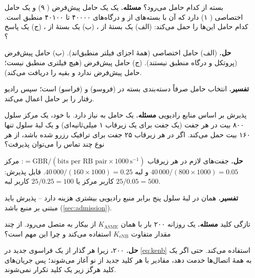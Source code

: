 \documentclass[11pt,a4paper]{article}
\begin{document}
\begin{examplebox}{بسته از کدام حامل می‌رود؟}\label{ex:tft}
\textbf{مسئله.} یک  یک حامل پیش‌فرض ( ۹) و یک حامل اختصاصی ( ۱) دارد که  آن با
بسته‌های  از  و درگاه‌های ۴۰۰۰۰ تا ۴۰۱۰۰ منطبق است. کدام حامل این‌ها را حمل می‌کند: (الف) یک بستهٔ
 از ، (ب) یک بستهٔ  از ، (ج) یک پاسخ ؟

\textbf{حل.} (الف) حامل اختصاصی (همهٔ اجزای فیلتر منطبق‌اند). (ب) حامل پیش‌فرض (پروتکل و درگاه منطبق نیستند). (ج) حامل
پیش‌فرض (هیچ فیلتری منطبق نیست؛ حامل پیش‌فرض  ندارد و بقیه را دریافت می‌کند).

\textbf{تفسیر.} انتخاب حامل صرفاً دسته‌بندی بسته در  (فروسو) و  (فراسو) است؛ سپس رادیو رفتار 
را بر حامل اعمال می‌کند.
\end{examplebox}

\begin{examplebox}{پذیرش بر اساس منابع رادیویی}\label{ex:rbadm}
\textbf{مسئله.} یک حامل  به  نیاز دارد. با  خود، یک  مرکز سلول ۸۰۰ بیت در هر
جفت  (یک جفت  برای یک زیرقاب ۱ میلی‌ثانیه‌ای) و یک  لبهٔ سلول تنها ۱۶۰ بیت حمل می‌کند. اگر در هر
زیرقاب ۲۵ جفت  برای ترافیک  رزرو شده باشد، از هر نوع چند تماس را می‌توان پذیرفت؟

\textbf{حل.} جفت‌های  لازم در هر زیرقاب $= \mathrm{GBR}/(\text{bits per RB pair}\times1000\,\mathrm{s}^{-1})$:
مرکز $40\,000/(800\times1000) = 0.05$ و لبه $40\,000/(160\times1000) = 0.25$. قابل پذیرش: $25/0.05 = 500$ کاربر مرکز یا
$25/0.25 = 100$ کاربر لبه.

\textbf{تفسیر.} همان  در لبهٔ سلول پنج برابر منبع رادیویی بیشتری هزینه دارد -- پذیرش باید مبتنی بر منبع باشد
(\cref{sec:admission}).
\end{examplebox}

\begin{examplebox}{تازگی کلید}\label{ex:fresh}
\textbf{مسئله.} یک  روزانه ۲۰۰ بار با همان $K_{\mathrm{ASME}}$ از بیکار به متصل می‌رود. از چند مقدار متفاوت
$K_{\mathrm{eNB}}$ استفاده می‌کند و چرا این مهم است؟

\textbf{حل.} ۲۰۰، زیرا هر گذار از یک  فراسوی جدید در \cref{eq:kenb} استفاده می‌کند. حتی اگر یک  به
همهٔ اتصال‌ها خدمت دهد، مقادیر  با هر کلید جدید از نو آغاز می‌شوند؛ پس جریان‌های کلید هرگز زیر یک کلید
تکرار نمی‌شوند.
\end{examplebox}
\end{document}
